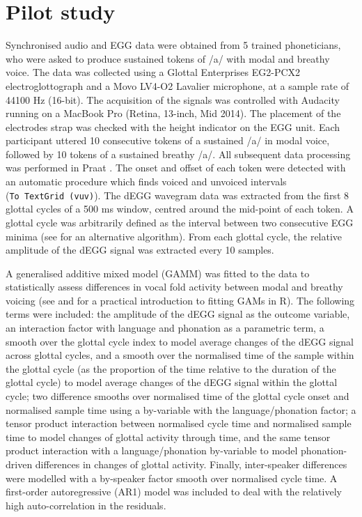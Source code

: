 \documentclass[
  11pt,
  a4paper,
]{article}
\begin{document}
\hypertarget{pilot-study}{%
\section{Pilot study}\label{pilot-study}}

\label{s:pilot}

Synchronised audio and EGG data were obtained from 5 trained
phoneticians, who were asked to produce sustained tokens of /a/ with
modal and breathy voice. The data was collected using a Glottal
Enterprises EG2-PCX2 electroglottograph and a Movo LV4-O2 Lavalier
microphone, at a sample rate of 44100 Hz (16-bit). The acquisition of
the signals was controlled with Audacity running on a MacBook Pro
(Retina, 13-inch, Mid 2014). The placement of the electrodes strap was
checked with the height indicator on the EGG unit. Each participant
uttered 10 consecutive tokens of a sustained /a/ in modal voice,
followed by 10 tokens of a sustained breathy /a/. All subsequent data
processing was performed in Praat \citep{boersma2018}. The onset and
offset of each token were detected with an automatic procedure which
finds voiced and unvoiced intervals (\texttt{To\ TextGrid\ (vuv)}). The
dEGG wavegram data was extracted from the first 8 glottal cycles of a
500 ms window, centred around the mid-point of each token. A glottal
cycle was arbitrarily defined as the interval between two consecutive
EGG minima (see \citealt{herbst2010} for an alternative algorithm). From
each glottal cycle, the relative amplitude of the dEGG signal was
extracted every 10 samples.

A generalised additive mixed model (GAMM) was fitted to the data to
statistically assess differences in vocal fold activity between modal
and breathy voicing (see \citealt{soskuthy2017} and
\citealt{wieling2018} for a practical introduction to fitting GAMs in
R). The following terms were included: the amplitude of the dEGG signal
as the outcome variable, an interaction factor with language and
phonation as a parametric term, a smooth over the glottal cycle index to
model average changes of the dEGG signal across glottal cycles, and a
smooth over the normalised time of the sample within the glottal cycle
(as the proportion of the time relative to the duration of the glottal
cycle) to model average changes of the dEGG signal within the glottal
cycle; two difference smooths over normalised time of the glottal cycle
onset and normalised sample time using a by-variable with the
language/phonation factor; a tensor product interaction between
normalised cycle time and normalised sample time to model changes of
glottal activity through time, and the same tensor product interaction
with a language/phonation by-variable to model phonation-driven
differences in changes of glottal activity. Finally, inter-speaker
differences were modelled with a by-speaker factor smooth over
normalised cycle time. A first-order autoregressive (AR1) model was
included to deal with the relatively high auto-correlation in the
residuals.
\end{document}

